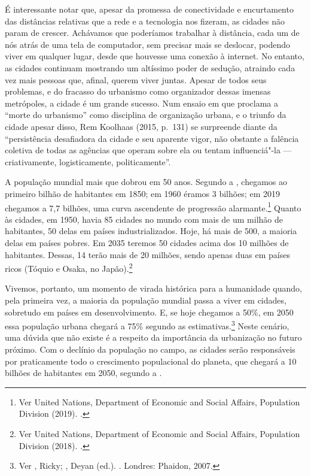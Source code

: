É interessante notar que, apesar da promessa de conectividade e
encurtamento das distâncias relativas que a rede e a tecnologia nos
fizeram, as cidades não param de crescer. Achávamos que poderíamos
trabalhar à distância, cada um de nós atrás de uma tela de computador,
sem precisar mais se deslocar, podendo viver em qualquer lugar, desde
que houvesse uma conexão à internet. No entanto, as cidades continuam
mostrando um altíssimo poder de sedução, atraindo cada vez mais pessoas
que, afinal, querem viver juntas. Apesar de todos seus problemas, e do
fracasso do urbanismo como organizador dessas imensas metrópoles, a
cidade é um grande sucesso. Num ensaio em que proclama a ``morte do
urbanismo'' como disciplina de organização urbana, e o triunfo da cidade
apesar disso, Rem Koolhaas (2015, p.~131) se surpreende diante da
``persistência desafiadora da cidade e seu aparente vigor, não obstante
a falência coletiva de todas as agências que operam sobre ela ou tentam
influenciá"-la --- criativamente, logisticamente, politicamente''.

A população mundial mais que dobrou em 50 anos. Segundo a , chegamos
ao primeiro bilhão de habitantes em 1850; em 1960 éramos 3 bilhões; em
2019 chegamos a 7,7 bilhões, uma curva ascendente de progressão
alarmante.\footnote{Ver United Nations, Department of Economic and
  Social Affairs, Population Division (2019). {}.} Quanto às cidades, em 1950, havia 85
cidades no mundo com mais de um milhão de habitantes, 50 delas em países
industrializados. Hoje, há mais de 500, a maioria delas em países
pobres. Em 2035 teremos 50 cidades acima dos 10 milhões de habitantes.
Dessas, 14 terão mais de 20 milhões, sendo apenas duas em países ricos
(Tóquio e Osaka, no Japão).\footnote{Ver United Nations, Department of
  Economic and Social Affairs, Population Division (2018). {}.}

Vivemos, portanto, um momento de virada histórica para a humanidade
quando, pela primeira vez, a maioria da população mundial passa a viver
em cidades, sobretudo em países em desenvolvimento. E, se hoje chegamos
a 50\%, em 2050 essa população urbana chegará a 75\% segundo as
estimativas.\footnote{Ver , Ricky; , Deyan (ed.). {}. Londres: Phaidon, 2007.} Neste cenário, uma dúvida que
não existe é a respeito da importância da urbanização no futuro próximo.
Com o declínio da população no campo, as cidades serão responsáveis por
praticamente todo o crescimento populacional do planeta, que chegará a
10 bilhões de habitantes em 2050, segundo a .

